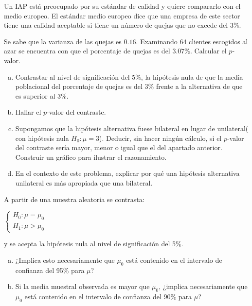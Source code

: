 \documentclass[12pt]{article}\usepackage[]{graphicx}\usepackage[]{color}
\begin{document}
\begin{prob}
Un IAP está preocupado por su estándar de calidad y quiere compararlo con el medio europeo.
El estándar medio europeo dice que una empresa de este sector tiene una calidad aceptable
si tiene un número de quejas que no excede del 3\%.

Se sabe que la varianza de las quejas es $0.16$. Examinando $64$ clientes escogidos al azar
se encuentra con que el porcentaje de quejas es del $3.07\%$. Calcular el $p$-valor.

\begin{enumerate}[a)]
\item Contrastar al nivel de significación del 5\%, la hipótesis nula
de que la media poblacional del porcentaje de quejas es del 3\%
frente a la alternativa de que es superior al 3\%.
\item Hallar el $p$-valor del contraste.
\item Supongamos que la hipótesis alternativa fuese bilateral en
lugar de unilateral( con hipótesis nula $H_{0}:\mu=3$). Deducir, sin
hacer ningún cálculo, si el $p$-valor del contraste sería mayor,
menor o igual que el del apartado anterior. Construir un gráfico
para ilustrar el razonamiento.
\item En el contexto de este problema, explicar por qué una hipótesis
alternativa unilateral es más apropiada que una bilateral.
\end{enumerate}
\end{prob}

\begin{prob}
A partir de una muestra aleatoria se contrasta:

$\left\{\begin{array}{l}
H_{0}:\mu=\mu_{0}\\
H_{1}:\mu>\mu_{0}\end{array}\right.$

y se acepta la hipótesis nula al nivel de significación del 5\%.

\begin{enumerate}[a)]
\item ¿Implica esto necesariamente que $\mu_{0}$ está contenido
en el intervalo de confianza del 95\% para $\mu$?
\item Si la media muestral observada es mayor que $\mu_{0}$,
¿implica necesariamente que $\mu_{0}$ está contenido en el
intervalo de confianza  del 90\% para $\mu$?
\end{enumerate}
\end{prob}
\end{document}
